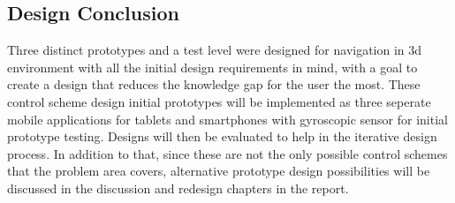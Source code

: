 \subsection{Design Conclusion}
Three distinct prototypes and a test level were designed for navigation in 3d environment with all the initial design requirements in mind, with a goal to create a design that reduces the knowledge gap for the user the most. These control scheme design initial prototypes will be implemented as three seperate mobile applications for tablets and smartphones with gyroscopic sensor for initial prototype testing. Designs will then be evaluated to help in the iterative design process.
In addition to that, since these are not the only possible control schemes that the problem area covers, alternative prototype design possibilities will be discussed in the discussion and redesign chapters in the report. 

